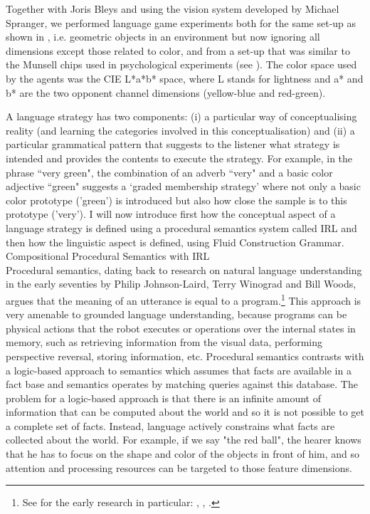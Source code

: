 Together with Joris Bleys and using the vision system developed by Michael Spranger, we 
performed language game experiments both for the same set-up as shown in , 
i.e. geometric objects in an environment but now ignoring all dimensions except those related to color, 
and from a set-up that was similar to the Munsell chips used
in psychological experiments (see ). The color space used by the agents was the CIE L*a*b* space, where 
L stands for lightness and a* and b* are the two opponent channel dimensions (yellow-blue and red-green). 

A language strategy has two components: (i) a particular way of conceptualising reality (and learning the categories involved
in this conceptualisation) and (ii) a particular grammatical pattern that suggests to the listener what strategy is intended 
and provides the contents to execute the strategy. For example, in the phrase ``very green", the combination of an adverb 
``very" and a basic color adjective ``green" suggests a `graded membership strategy' where not only a basic color prototype
('green') is introduced but also how close the sample is to this prototype ('very'). I will now introduce first how 
the conceptual aspect of a language strategy is defined using a procedural semantics system called IRL and then how the 
linguistic aspect is defined, using Fluid Construction Grammar. \\ 

{\bfshape Compositional Procedural Semantics with IRL}\\

Procedural semantics, dating back to research on natural language understanding in the 
early seventies by Philip Johnson-Laird, Terry Winograd and Bill Woods, argues that the meaning of an utterance is 
equal to a program.\footnote{See for the early research in particular: \cite{Winograd:1971}, \cite{Woods:1981}, 
\cite{Johnson-Laird:1977}.} 
This approach is very amenable to grounded language understanding, because programs can be physical 
actions that the robot executes or operations over the internal states in memory, such as retrieving information
from the visual data, performing perspective reversal, storing information, etc. Procedural semantics
contrasts with a logic-based approach to semantics which assumes that facts are available in a fact base and semantics operates
by matching queries against this database. The problem for a logic-based approach
is that there is an infinite amount of
information that can be computed about the world and so it is not possible to get a 
complete set of facts. Instead, language actively constrains what facts are collected about the world. For example, if 
we say "the red ball", the hearer knows that he has to focus on the shape and color of the objects in front of him, 
and so attention and processing resources can be targeted to those feature dimensions. 

